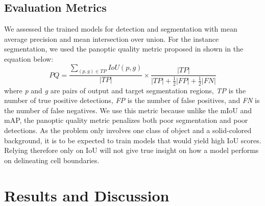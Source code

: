 \documentclass[journal]{IEEEtran}
\begin{document}
\subsection{Evaluation Metrics}
We assessed the trained models for detection and segmentation with mean average precision and mean intersection over union. For the instance segmentation, we used the panoptic quality metric proposed in \cite{DBLP:journals/corr/abs-1801-00868} shown in the equation below:
\begin{equation}
PQ = \frac{\sum_{(p,g)\in TP}IoU(p,g)}{|TP|} \times \frac{|TP|}{|TP| + \frac{1}{2}|FP| + \frac{1}{2}|FN|}
\end{equation}
where \textit{p} and \textit{g} are pairs of output and target segmentation regions, \textit{TP} is the number of true positive detections, \textit{FP} is the number of false positives, and \textit{FN} is the number of false negatives. We use this metric because unlike the mIoU and mAP, the panoptic quality metric penalizes both poor segmentation and poor detections. As the problem only involves one class of object and a solid-colored background, it is to be expected to train models that would yield high IoU scores. Relying therefore only on IoU will not give true insight on how a model performs on delineating cell boundaries.
\section{Results and Discussion}
\end{document}
